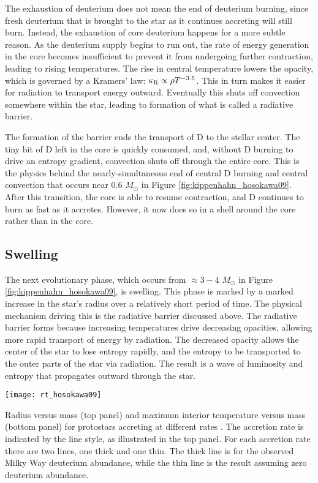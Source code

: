 The exhaustion of deuterium does not mean the end of deuterium burning, since fresh deuterium that is brought to the star as it continues accreting will still burn. Instead, the exhaustion of core deuterium happens for a more subtle reason. As the deuterium supply begins to run out, the rate of energy generation in the core becomes insufficient to prevent it from undergoing further contraction, leading to rising temperatures. The rise in central temperature lowers the opacity, which is governed by a Kramers' law: $\kappa_{\rm R} \propto \rho T^{-3.5}$. This in turn makes it easier for radiation to transport energy outward. Eventually this shuts off convection somewhere within the star, leading to formation of what is called a radiative barrier.

The formation of the barrier ends the transport of D to the stellar center. The tiny bit of D left in the core is quickly consumed, and, without D burning to drive an entropy gradient, convection shuts off through the entire core. This is the physics behind the nearly-simultaneous end of central D burning and central convection that occurs near $0.6$ $M_\odot$ in Figure \ref{fig:kippenhahn_hosokawa09}. After this transition, the core is able to resume contraction, and D continues to burn as fast as it accretes. However, it now does so in a shell around the core rather than in the core.

\subsection{Swelling}

The next evolutionary phase, which occurs from $\approx 3-4$ $M_\odot$ in Figure \ref{fig:kippenhahn_hosokawa09}, is swelling. This phase is marked by a marked increase in the star's radius over a relatively short period of time. The physical mechanism driving this is the radiative barrier discussed above. The radiative barrier forms because increasing temperatures drive decreasing opacities, allowing more rapid transport of energy by radiation. The decreased opacity allows the center of the star to lose entropy rapidly, and the entropy to be transported to the outer parts of the star via radiation. The result is a wave of luminosity and entropy that propagates outward through the star.

\begin{marginfigure}
\texttt{[image: rt\_hosokawa09]}
\caption[Protostellar mass-radius relation for different accretion rates]{
\label{fig:rt_hosokawa09}
Radius versus mass (top panel) and maximum interior temperature versus mass (bottom panel) for protostars accreting at different rates \citep{hosokawa09a}. The accretion rate is indicated by the line style, as illustrated in the top panel. For each accretion rate there are two lines, one thick and one thin. The thick line is for the observed Milky Way deuterium abundance, while the thin line is the result assuming zero deuterium abundance.
}
\end{marginfigure}

